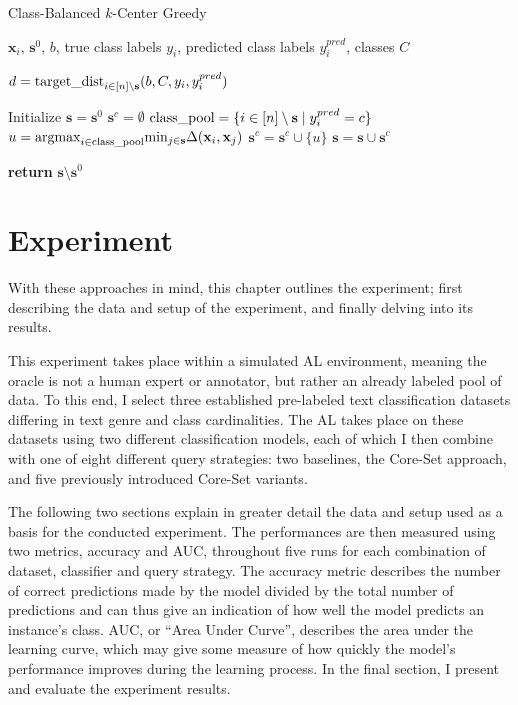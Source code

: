 \documentclass[english,bachelor,ul]{webisthesis} %
\begin{document}
\begin{algorithm}
    \caption{Class-Balanced $k$-Center Greedy}%
\label{alg:classbalanced}
\begin{algorithmic}

\Require $ \mathbf{x}_i $, $ \mathbf{s}^0 $, $ b $, true class labels $ y_i $, predicted class labels $ y^{pred}_i $, classes $ C $

\State $ d = \text{target\textunderscore dist}_{i \in [n] \setminus \mathbf{s}} (b, C, y_i, y^{pred}_i) $

\State Initialize $ \mathbf{s} = \mathbf{s}^0 $
\State $ \mathbf{s}^c = \emptyset $
\State $ \text{class\textunderscore pool} = \{i \in [n] \setminus \mathbf{s} \; | \; y_i^{pred} = c\} $
\Repeat
\State $ u = \text{argmax}_{i \in \text{class\textunderscore pool}}\text{min}_{j \in \mathbf{s}} \Delta(\mathbf{x}_i, \mathbf{x}_j) $
\State $ \mathbf{s}^c = \mathbf{s}^c \cup \{u\} $
\State $ \mathbf{s} = \mathbf{s} \cup \mathbf{s}^c $
\EndFor

\State \textbf{return} $ \mathbf{s} \setminus \mathbf{s}^0 $
\end{algorithmic}
\end{algorithm}

\chapter{Experiment}

With these approaches in mind, this chapter outlines the experiment; first describing the data and setup of the experiment, and finally delving into its results. 

This experiment takes place within a simulated AL environment, meaning the oracle is not a human expert or annotator, but rather an already labeled pool of data. To this end, I select three established pre-labeled text classification datasets differing in text genre and class cardinalities. The AL takes place on these datasets using two different classification models, each of which I then combine with one of eight different query strategies: two baselines, the Core-Set approach, and five previously introduced Core-Set variants.

The following two sections explain in greater detail the data and setup used as a basis for the conducted experiment. The performances are then measured using two metrics, accuracy and AUC, throughout five runs for each combination of dataset, classifier and query strategy. The accuracy metric describes the number of correct predictions made by the model divided by the total number of predictions and can thus give an indication of how well the model predicts an instance's class. AUC, or ``Area Under Curve'', describes the area under the learning curve, which may give some measure of how quickly the model's performance improves during the learning process. In the final section, I present and evaluate the experiment results.
\end{document}
